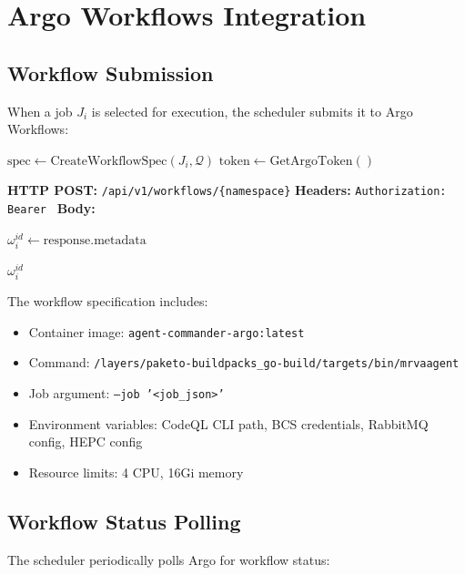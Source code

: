 \documentclass[11pt]{article}
\begin{document}
\section{Argo Workflows Integration}

\subsection{Workflow Submission}

When a job $J_i$ is selected for execution, the scheduler submits it to Argo Workflows:

\begin{algorithm}[H]
\caption{Submit Job to Argo Workflows}
\begin{algorithmic}[1]
  \State $\text{spec} \gets \text{CreateWorkflowSpec}(J_i, \mathcal{Q})$
  \State $\text{token} \gets \text{GetArgoToken}()$ 

  \State \textbf{HTTP POST:} \texttt{/api/v1/workflows/\{namespace\}}
  \State \quad \textbf{Headers:} \texttt{Authorization: Bearer }
  \State \quad \textbf{Body:} 

  \State $\omega_i^{id} \gets \text{response.metadata}$ 

  \State \Return $\omega_i^{id}$
\EndProcedure
\end{algorithmic}
\end{algorithm}

The workflow specification includes:
\begin{itemize}
\item Container image: \texttt{agent-commander-argo:latest}
\item Command: \texttt{/layers/paketo-buildpacks\_go-build/targets/bin/mrvaagent}
\item Job argument: \texttt{--job '<job\_json>'}
\item Environment variables: CodeQL CLI path, BCS credentials, RabbitMQ config, HEPC config
\item Resource limits: 4 CPU, 16Gi memory
\end{itemize}

\subsection{Workflow Status Polling}

The scheduler periodically polls Argo for workflow status:
\end{document}
